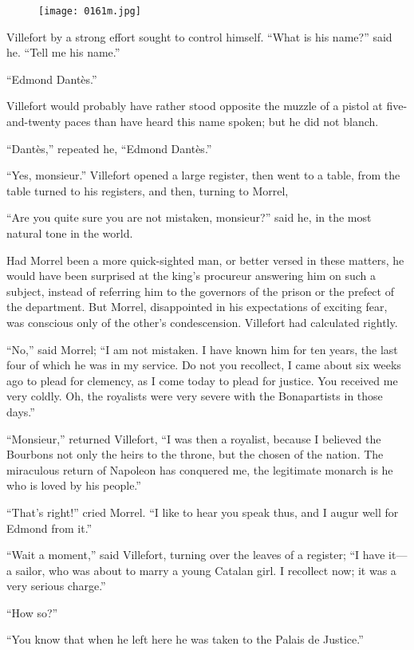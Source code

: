 \begin{figure}[ht]
\texttt{[image: 0161m.jpg]}
\end{figure}

Villefort by a strong effort sought to control himself. “What is his
name?” said he. “Tell me his name.”

“Edmond Dantès.”

Villefort would probably have rather stood opposite the muzzle of a
pistol at five-and-twenty paces than have heard this name spoken; but
he did not blanch.

“Dantès,” repeated he, “Edmond Dantès.”

“Yes, monsieur.” Villefort opened a large register, then went to a
table, from the table turned to his registers, and then, turning to
Morrel,

“Are you quite sure you are not mistaken, monsieur?” said he, in the
most natural tone in the world.

Had Morrel been a more quick-sighted man, or better versed in these
matters, he would have been surprised at the king’s procureur answering
him on such a subject, instead of referring him to the governors of the
prison or the prefect of the department. But Morrel, disappointed in
his expectations of exciting fear, was conscious only of the other’s
condescension. Villefort had calculated rightly.

“No,” said Morrel; “I am not mistaken. I have known him for ten years,
the last four of which he was in my service. Do not you recollect, I
came about six weeks ago to plead for clemency, as I come today to
plead for justice. You received me very coldly. Oh, the royalists were
very severe with the Bonapartists in those days.”

“Monsieur,” returned Villefort, “I was then a royalist, because I
believed the Bourbons not only the heirs to the throne, but the chosen
of the nation. The miraculous return of Napoleon has conquered me, the
legitimate monarch is he who is loved by his people.”

“That’s right!” cried Morrel. “I like to hear you speak thus, and I
augur well for Edmond from it.”

“Wait a moment,” said Villefort, turning over the leaves of a register;
“I have it—a sailor, who was about to marry a young Catalan girl. I
recollect now; it was a very serious charge.”

“How so?”

“You know that when he left here he was taken to the Palais de
Justice.”

